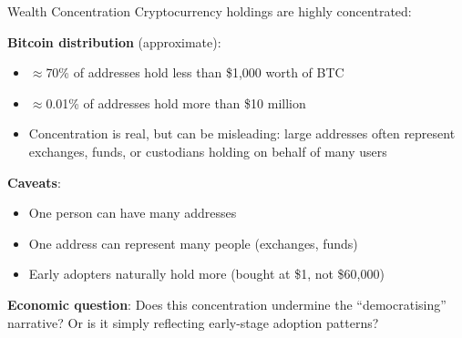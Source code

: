 \documentclass[10pt]{beamer}
\begin{document}
\begin{frame}{Wealth Concentration}
  Cryptocurrency holdings are highly concentrated:
  
  \vspace{1em}
  
  \textbf{Bitcoin distribution} (approximate):
  \begin{itemize}
    \item $\approx$70\% of addresses hold less than \$1{,}000 worth of BTC
    \item $\approx$0.01\% of addresses hold more than \$10 million
    \item Concentration is real, but can be misleading: large addresses often represent exchanges, funds, or custodians holding on behalf of many users
  \end{itemize}
  
  \vspace{1em}
  \textbf{Caveats}:
  \begin{itemize}
    \item One person can have many addresses
    \item One address can represent many people (exchanges, funds)
    \item Early adopters naturally hold more (bought at \$1, not \$60,000)
  \end{itemize}
  
  \vspace{1em}
  \textbf{Economic question}: Does this concentration undermine the ``democratising'' narrative? Or is it simply reflecting early-stage adoption patterns?
\end{frame}
\end{document}
